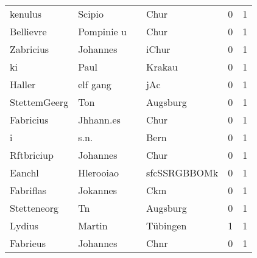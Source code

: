 \begin{tabular}{llllrr}
                  kenulus &                             Scipio &             &                                        Chur &          0 &         1 \\
                Bellievre &                         Pompinie u &             &                                        Chur &          0 &         1 \\
                Zabricius &                           Johannes &             &                                       iChur &          0 &         1 \\
                       ki &                               Paul &             &                                      Krakau &          0 &         1 \\
                   Haller &                           elf gang &             &                                         jAc &          0 &         1 \\
             StettemGeerg &                                Ton &             &                                    Augsburg &          0 &         1 \\
                Fabricius &                          Jhhann.es &             &                                        Chur &          0 &         1 \\
                        i &                               s.n. &             &                                        Bern &          0 &         1 \\
               Rftbriciup &                           Johannes &             &                                        Chur &          0 &         1 \\
                   Eanchl &                          Hlerooiao &             &                                sfcSSRGBBOMk &          0 &         1 \\
                Fabriflas &                           Jokannes &             &                                         Ckm &          0 &         1 \\
              Stetteneorg &                                 Tn &             &                                    Augsburg &          0 &         1 \\
                   Lydius &                             Martin &             &                                    Tübingen &          1 &         1 \\
                 Fabrieus &                           Johannes &             &                                        Chnr &          0 &         1 \\

\end{tabular}
